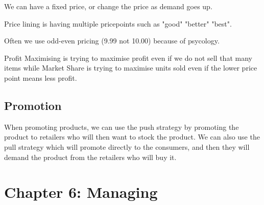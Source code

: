 \documentclass[12pt,letterpaper]{article} \usepackage{amsmath} \usepackage{graphicx} \usepackage[margin=1in]{geometry} \usepackage{longtable}  \usepackage{amssymb}
\begin{document}
		We can have a fixed price, or change the price as demand goes up.
		
		Price lining is having multiple pricepoints such as "good" "better" "best".
		
		Often we use odd-even pricing (9.99 not 10.00) because of psycology.
		
		Profit Maximising is trying to maximise profit even if we do not sell that many items while Market Share is trying to maximise units sold even if the lower price point means less profit. 
		
		\subsection{Promotion}
		When promoting products, we can use the push strategy by promoting the product to retailers who will then want to stock the product. We can also use the pull strategy which will promote directly to the consumers, and then they will demand the product from the retailers who will buy it. 
		
		
		\section{Chapter 6: Managing}
	
\end{document}
